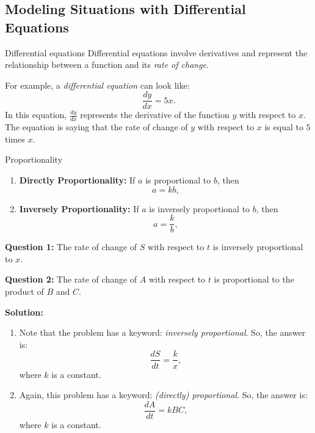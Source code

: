 \documentclass[12pt]{article}
\theoremstyle{beautifulthm}
\begin{document}
\subsection{Modeling Situations with Differential Equations}
\begin{Definition}{Differential equations}{}
Differential equations involve derivatives and represent the relationship between a function and its \textit{rate of change}.    
\end{Definition}
For example, a \textit{differential equation} can look like:
\[
\frac{dy}{dx} = 5x.
\]
In this equation, \(\frac{dy}{dx}\) represents the derivative of the function \(y\) with respect to \(x\). The equation is saying that the rate of change of \(y\) with respect to \(x\) is equal to \(5\) times \(x\).

\begin{mytheorem}{Proportionality}{}

\begin{enumerate}
    \item \textbf{Directly Proportionality:} If \(a\) is proportional to \(b\), then
    \[
    a = k b, 
    \]

    \item \textbf{Inversely Proportionality:} If \(a\) is inversely proportional to \(b\), then
    \[
    a = \frac{k}{b},
    \]
\end{enumerate}
\end{mytheorem}

\begin{tcolorbox}[colback=examplebg, colframe=red!75!black, title=\textbf{EXAMPLE 1: Proportionality Questions}, fonttitle=\bfseries, sharp corners]

\textbf{Question 1:} The rate of change of \( S \) with respect to \( t \) is inversely proportional to \( x \).

\textbf{Question 2:} The rate of change of \( A \) with respect to \( t \) is proportional to the product of \( B \) and \( C \).



\tcblower
\textbf{Solution:} 
\begin{enumerate}
    \item Note that the problem has a keyword: \textit{inversely proportional}. So, the answer is:
    \[
    \frac{dS}{dt} = \frac{k}{x},
    \]
    where \( k \) is a constant.

    \item Again, this problem has a keyword: \textit{(directly) proportional}. So, the answer is:
    \[
    \frac{dA}{dt} = kBC,
    \]
    where \( k \) is a constant.
\end{enumerate}
\end{tcolorbox}
\end{document}
